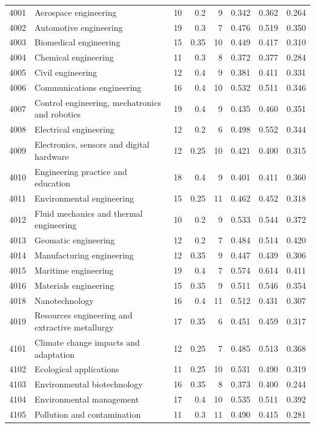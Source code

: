 \begin{longtable}{r p{3.35cm} rr r rrr}
4001 & Aerospace engineering & 10 & 0.2 & 9 & 0.342 & 0.362 & 0.264 \\
4002 & Automotive engineering & 19 & 0.3 & 7 & 0.476 & 0.519 & 0.350 \\
4003 & Biomedical engineering & 15 & 0.35 & 10 & 0.449 & 0.417 & 0.310 \\
4004 & Chemical engineering & 11 & 0.3 & 8 & 0.372 & 0.377 & 0.284 \\
4005 & Civil engineering & 12 & 0.4 & 9 & 0.381 & 0.411 & 0.331 \\
4006 & Communications engineering & 16 & 0.4 & 10 & 0.532 & 0.511 & 0.346 \\
4007 & Control engineering, mechatronics and robotics & 19 & 0.4 & 9 & 0.435 & 0.460 & 0.351 \\
4008 & Electrical engineering & 12 & 0.2 & 6 & 0.498 & 0.552 & 0.344 \\
4009 & Electronics, sensors and digital hardware & 12 & 0.25 & 10 & 0.421 & 0.400 & 0.315 \\
4010 & Engineering practice and education & 18 & 0.4 & 9 & 0.401 & 0.411 & 0.360 \\
4011 & Environmental engineering & 15 & 0.25 & 11 & 0.462 & 0.452 & 0.318 \\
4012 & Fluid mechanics and thermal engineering & 10 & 0.2 & 9 & 0.533 & 0.544 & 0.372 \\
4013 & Geomatic engineering & 12 & 0.2 & 7 & 0.484 & 0.514 & 0.420 \\
4014 & Manufacturing engineering & 12 & 0.35 & 9 & 0.447 & 0.439 & 0.306 \\
4015 & Maritime engineering & 19 & 0.4 & 7 & 0.574 & 0.614 & 0.411 \\
4016 & Materials engineering & 15 & 0.35 & 9 & 0.511 & 0.546 & 0.354 \\
4018 & Nanotechnology & 16 & 0.4 & 11 & 0.512 & 0.431 & 0.307 \\
4019 & Resources engineering and extractive metallurgy & 17 & 0.35 & 6 & 0.451 & 0.459 & 0.317 \\
4101 & Climate change impacts and adaptation & 12 & 0.25 & 7 & 0.485 & 0.513 & 0.368 \\
4102 & Ecological applications & 11 & 0.25 & 10 & 0.531 & 0.490 & 0.319 \\
4103 & Environmental biotechnology & 16 & 0.35 & 8 & 0.373 & 0.400 & 0.244 \\
4104 & Environmental management & 17 & 0.4 & 10 & 0.535 & 0.511 & 0.392 \\
4105 & Pollution and contamination & 11 & 0.3 & 11 & 0.490 & 0.415 & 0.281 \\

\end{longtable}
